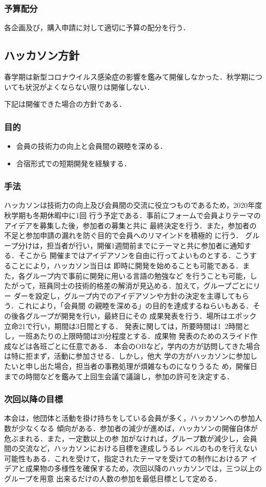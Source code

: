 \subsubsection*{予算配分}
各企画及び，購入申請に対して適切に予算の配分を行う．


\subsection*{ハッカソン方針}
春学期は新型コロナウイルス感染症の影響を鑑みて開催しなかった．秋学期についても状況がよくならない限りは開催しない．

下記は開催できた場合の方針である．

\subsubsection*{目的}
\begin{itemize}
    \item 会員の技術力の向上と会員間の親睦を深める．
    \item 合宿形式での短期開発を経験する．
\end{itemize}

\subsubsection*{手法}
ハッカソンは技術力の向上及び会員間の交流に役立つものであるため，2020年度秋学期も冬期休暇中に1回
行う予定である．事前にフォームで会員よりテーマのアイデアを募集した後，参加者の募集と共に
最終決定を行う．また，参加者の不足と参加申請の漏れを防ぐ目的で会員へのリマインドを積極的
に行う．
グループ分けは，担当者が行い，開催1週間前までにテーマと共に参加者に通知する．そこから
開催まではアイデアソンを自由に行ってよいものとする．こうすることにより，ハッカソン当日は
即時に開発を始めることも可能である．また，各グループ内で事前に開発に用いる言語の勉強など
を行うことも可能，したがって，班員同士の技術的格差の解消が見込める．加えて，グループごとにリー
ダーを設定し，グループ内でのアイデアソンや方針の決定を主導してもらう．これにより，「会員間
の親睦を深める」の目的を達成するねらいもある．その後各グループが開発を行い，最終日にその
成果発表を行う．場所はエポック立命21で行い，期間は3日間とする．
発表に関しては，所要時間は1~2時間とし，一班あたりの上限時間は20分程度とする．成果物
発表のためのスライド作成などは各班ごとに任意である．
本会のOBなど，学内の方が訪問してきた場合は特に拒まず，活動に参加させる．しかし，他大
学の方がハッカソンに参加したいと申し出た場合，担当者の事務処理が煩雑なものになりうるた
め，開催日までの時間などを鑑みて上回生会議で議論し，参加の許可を決定する．


\subsubsection*{次回以降の目標}
本会は，他団体と活動を掛け持ちをしている会員が多く，ハッカソンへの参加人数が少なくなる
傾向がある．参加者の減少が進めば，ハッカソンの開催自体が危ぶまれる．また，一定数以上の参
加がなければ，グループ数が減少し，会員間の交流など，ハッカソンにおける目標を達成しうるレ
ベルのものを行えない可能性もある．これを受けて，指定されたテーマを受けての制作におけるア
イデアと成果物の多様性を確保するため，次回以降のハッカソンでは，三つ以上のグループを用意
出来るだけの人数の参加を最低目標として定める．



